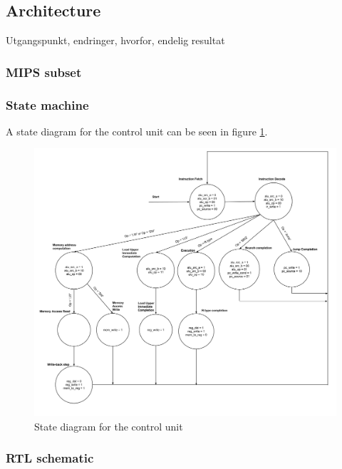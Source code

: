 \subsection{Architecture}

Utgangspunkt, endringer, hvorfor, endelig resultat

\subsubsection{MIPS subset}

\subsubsection{State machine}

A state diagram for the control unit can be seen in figure \ref{fig:state_machine}.

\begin{figure}[ht!]
    \begin{center}
    \includegraphics[width=\textwidth]{assets/state_machine.png}
    \caption{State diagram for the control unit}
    \label{fig:state_machine}
    \end{center}
\end{figure}

\subsubsection{RTL schematic}

